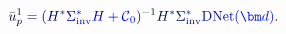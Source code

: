 \documentclass[12pt]{article}
\begin{document}
\makeatletter
\renewcommand*{\@textcolor}[3]{%
  \protect\leavevmode
  \begingroup
    \color#1{#2}#3%
  \endgroup
}
\makeatother
\begin{displaymath}
{\mathcolor[RGB]{0,0,15}{\bar { \mathcolor[RGB]{0,0,30}{u} } }} _ { \mathcolor[RGB]{0,0,45}{p} } ^ { \mathcolor[RGB]{0,0,60}{1} } \mathcolor[RGB]{0,0,75}{=} \mathcolor[RGB]{0,0,90}{(} \mathcolor[RGB]{0,0,105}{H} ^ { \mathcolor[RGB]{0,0,120}{*} } \mathcolor[RGB]{0,0,135}{\Sigma} _ { \mathrm { \mathcolor[RGB]{0,0,150}{i} \mathcolor[RGB]{0,0,165}{n} \mathcolor[RGB]{0,0,180}{v} } } ^ { \mathcolor[RGB]{0,0,195}{*} } \mathcolor[RGB]{0,0,210}{H} \mathcolor[RGB]{0,0,225}{+} \mathcal { \mathcolor[RGB]{0,0,240}{C} } _ { \mathcolor[RGB]{0,0,255}{0} } \mathcolor[RGB]{0,15,0}{)} ^ { \mathcolor[RGB]{0,15,15}{-} \mathcolor[RGB]{0,15,30}{1} } \mathcolor[RGB]{0,15,45}{H} ^ { \mathcolor[RGB]{0,15,60}{*} } \mathcolor[RGB]{0,15,75}{\Sigma} _ { \mathrm { \mathcolor[RGB]{0,15,90}{i} \mathcolor[RGB]{0,15,105}{n} \mathcolor[RGB]{0,15,120}{v} } } ^ { \mathcolor[RGB]{0,15,135}{*} } \mathrm { \mathcolor[RGB]{0,15,150}{D} \mathcolor[RGB]{0,15,165}{N} \mathcolor[RGB]{0,15,180}{e} \mathcolor[RGB]{0,15,195}{t} } \mathcolor[RGB]{0,15,210}{(} \mathcolor[RGB]{0,15,225}{\bm} { \mathcolor[RGB]{0,15,240}{d} } \mathcolor[RGB]{0,15,255}{)} \mathcolor[RGB]{0,30,0}{.}
\end{displaymath}
\end{document}
